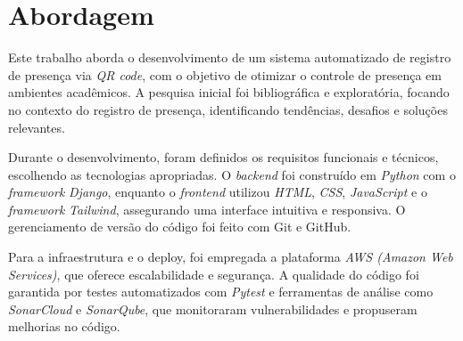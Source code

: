 \section{Abordagem}
\label{sec:abordagem}

Este trabalho aborda o desenvolvimento de um sistema automatizado de registro de presença via \textit{QR code}, com o objetivo de otimizar o controle de presença em ambientes acadêmicos. A pesquisa inicial foi bibliográfica e exploratória, focando no contexto do registro de presença, identificando tendências, desafios e soluções relevantes.

Durante o desenvolvimento, foram definidos os requisitos funcionais e técnicos, escolhendo as tecnologias apropriadas. O \textit{backend} foi construído em \textit{Python} com o \textit{framework} \textit{Django}, enquanto o \textit{frontend} utilizou \textit{HTML}, \textit{CSS}, \textit{JavaScript} e o \textit{framework} \textit{Tailwind}, assegurando uma interface intuitiva e responsiva. O gerenciamento de versão do código foi feito com Git e GitHub.

Para a infraestrutura e o deploy, foi empregada a plataforma \textit{AWS (Amazon Web Services)}, que oferece escalabilidade e segurança. A qualidade do código foi garantida por testes automatizados com \textit{Pytest} e ferramentas de análise como \textit{SonarCloud} e \textit{SonarQube}, que monitoraram vulnerabilidades e propuseram melhorias no código.
